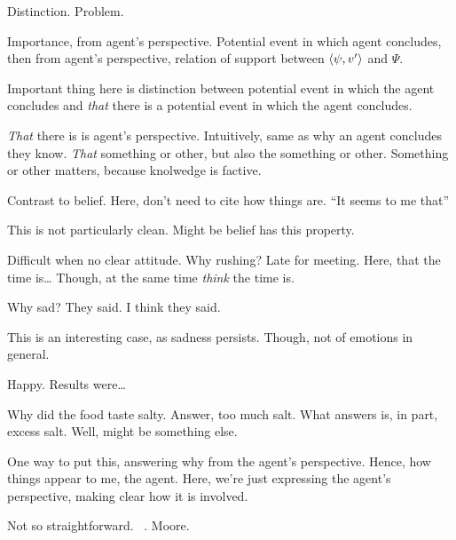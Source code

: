 \begin{note}
  Distinction.
  Problem.
\end{note}

\begin{note}[Distinction]
  Importance, \qWhy{} from agent's perspective.
  Potential event in which agent concludes, then from agent's perspective, relation of support between \(\langle \psi, v' \rangle\) and \(\Psi\).

  Important thing here is distinction between potential event in which the agent concludes and \emph{that} there is a potential event in which the agent concludes.

  \emph{That} there is is agent's perspective.
  Intuitively, same as why an agent concludes they know.
  \emph{That} something or other, but also the something or other.
  Something or other matters, because knolwedge is factive.

  Contrast to belief.
  Here, don't need to cite how things are.
  ``It seems to me that''

  This is not particularly clean.
  Might be belief has this property.

  Difficult when no clear attitude.
  Why rushing?
  Late for meeting.
  Here, that the time is\dots
  Though, at the same time \emph{think} the time is.

  Why sad?
  They said.
  I think they said.

  This is an interesting case, as sadness persists.
  Though, not of emotions in general.

  Happy.
  Results were\dots

  Why did the food taste salty.
  Answer, too much salt.
  What answers is, in part, excess salt.
  Well, might be something else.

  One way to put this, answering why from the agent's perspective.
  Hence, how things appear to me, the agent.
  Here, we're just expressing the agent's perspective, making clear how it is involved.

  Not so straightforward.
  ~\cite{Collins:1997wn}.
  Moore.


\end{note}
